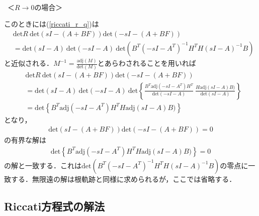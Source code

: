 \ \\\
＜$R \rightarrow 0$の場合＞

このときには(\ref{riccati_r_q})は
\begin{align}
	& %
	\mbox{det}R \ \mbox{det}({sI-(A + B F)})\mbox{det}({-sI-(A + B F)})
\nonumber \\
		&= \mbox{det}(sI-A) \ \mbox{det}(-sI-A) \ 
			\mbox{det}( B^T (-sI - A^T)^{-1}H^T H (sI - A)^{-1} B)
\end{align}
と近似される．$M^{-1}=\frac{\mbox{adj}(M)}{\mbox{det}(M)}$とあらわされることを用いれば
\begin{align}
	& %
	\mbox{det}R \ \mbox{det}({sI-(A + B F)})\mbox{det}({-sI-(A + B F)})
\nonumber \\
		&= \mbox{det}(sI-A) \ \mbox{det}(-sI-A) \ 
			\mbox{det}\left \{ \frac{B^T \mbox{adj}(-sI - A^T)H^T}{\mbox{det}(-sI-A)}
								\ \frac{H \mbox{adj}(sI - A) B)}{\mbox{det}(sI-A)}  \right \}
\nonumber \\
		&= \mbox{det}\left \{ {B^T \mbox{adj}(-sI - A^T)H^T} {H \mbox{adj}(sI - A) B)} \right \}
\end{align}
となり，
\begin{align}
	\mbox{det}({sI-(A + B F)})\mbox{det}({-sI-(A + B F)})=0
\nonumber
\end{align}
の有界な解は
\begin{align}
	\mbox{det}\left \{ {B^T \mbox{adj}(-sI - A^T)H^T} {H \mbox{adj}(sI - A) B)} \right \}=0
\nonumber
\end{align}
の解と一致する．これは$\mbox{det}( B^T (-sI - A^T)^{-1}H^T H (sI - A)^{-1} B)$の零点に一致する．無限遠の解は根軌跡と同様に求められるが，ここでは省略する．


\subsection{Riccati方程式の解法}

